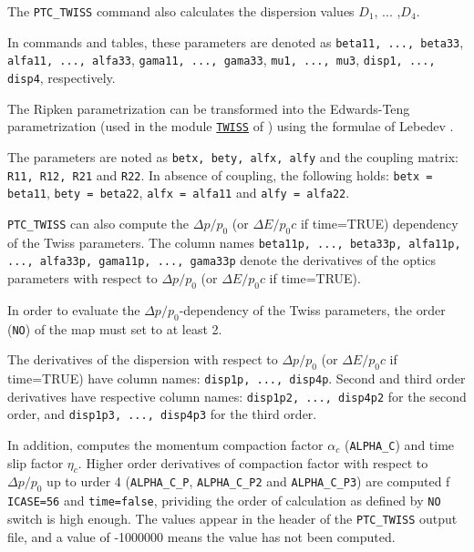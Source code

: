 The \texttt{PTC\_TWISS} command also calculates the dispersion values
$D_1$, ... ,$D_4$.

In \madx commands and tables, these parameters are denoted as
\texttt{beta11, ..., beta33}, \texttt{alfa11, ..., alfa33},
\texttt{gama11, ..., gama33}, \texttt{mu1, ..., mu3},
\texttt{disp1, ..., disp4}, respectively. 

The Ripken parametrization can be transformed into the Edwards-Teng
parametrization (used in the module
\hyperref[chap:twiss]{\texttt{TWISS}} of \madx) using the formulae of
Lebedev \cite{lebedev2010}. 

The parameters are noted as \texttt{betx, bety, alfx, alfy} and the
coupling matrix: \texttt{R11, R12, R21} and \texttt{R22}. In absence of
coupling, the following holds: \texttt{betx = beta11}, \texttt{bety = beta22},
\texttt{alfx = alfa11} and \texttt{alfy = alfa22}.

\texttt{PTC\_TWISS} can also compute the $\Delta p/p_0$ 
(or $\Delta E/p_0 c$ if time=TRUE) dependency 
of the Twiss parameters. The column names \texttt{beta11p, ..., beta33p,
  alfa11p, ..., alfa33p, gama11p, ..., gama33p} denote the derivatives of
the optics parameters with respect to $\Delta p/p_0$ (or $\Delta E/p_0 c$ if time=TRUE). 

In order to evaluate the $\Delta p/p_0$-dependency of the Twiss parameters,
the order (\texttt{NO}) of the map must set to at least 2.  

The derivatives of the dispersion with respect to $\Delta p/p_0$ 
(or $\Delta E/p_0 c$ if time=TRUE)
have column names: \texttt{disp1p, ..., disp4p}. 
Second and third order derivatives have respective column names:  
\texttt{disp1p2, ..., disp4p2} for the second order, and 
\texttt{disp1p3, ..., disp4p3} for the third order.

In addition, \ptc computes the momentum compaction factor $\alpha_c$ (\texttt{ALPHA\_C}) and time 
slip factor $\eta_c$. Higher order derivatives of compaction factor  
with respect to $\Delta p/p_0$ up to urder 4  (\texttt{ALPHA\_C\_P}, \texttt{ALPHA\_C\_P2} and \texttt{ALPHA\_C\_P3})
are computed  f \texttt{ICASE=56} and \texttt{time=false}, prividing the order of 
calculation as defined by \texttt{NO} switch is high enough.
The values appear in the header of the \texttt{PTC\_TWISS} output file, 
and a value of -1000000 means the value has not been computed.


